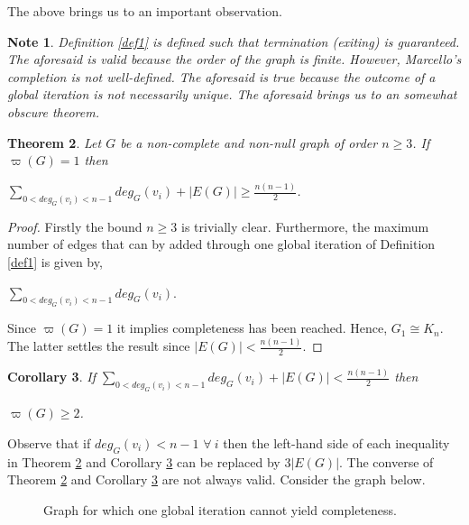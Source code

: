 \documentclass[12pt]{amsart}
\numberwithin{equation}{section}
\newtheorem{theorem}{Theorem}[section]
\newtheorem{corollary}[theorem]{Corollary}
\newtheorem{note}[theorem]{Note}
\numberwithin{equation}{section}
\begin{document}
The above brings us to an important observation.
\begin{note}
Definition \ref{def1} is defined such that termination (exiting) is guaranteed. The aforesaid is valid because the order of the graph is finite. However, Marcello's completion is not well-defined. The aforesaid is true because the outcome of a global iteration is not necessarily unique. The aforesaid brings us to an somewhat obscure theorem.
\end{note}
\begin{theorem}\label{thm1}
Let $G$ be a non-complete and non-null graph of order $n \geq 3$. If $\varpi(G) = 1$ then
\begin{center}
$\sum\limits_{0<deg_G(v_i) < n-1}deg_G(v_i) + |E(G)| \geq \frac{n(n-1)}{2}$.
\end{center}
\end{theorem}
\begin{proof}
Firstly the bound $n \geq 3$ is trivially clear. Furthermore, the maximum number of edges that can by added through one global iteration of Definition \ref{def1} is given by,
\begin{center}
$\sum\limits_{0<deg_G(v_i) < n-1}deg_G(v_i)$.
\end{center}
Since $\varpi(G) = 1$ it implies completeness has been reached. Hence, $G_1 \cong K_n$. The latter settles the result since $|E(G)| < \frac{n(n-1)}{2}$.
\end{proof}
\begin{corollary}\label{cor1}
If $\sum\limits_{0<deg_G(v_i) < n-1}deg_G(v_i) + |E(G)| < \frac{n(n-1)}{2}$ then
\begin{center}
$\varpi(G) \geq 2$.
\end{center}
\end{corollary}
Observe that if $deg_G(v_i) < n-1$ $\forall~i$ then the left-hand side of each inequality in Theorem \ref{thm1} and Corollary \ref{cor1} can be replaced by $3|E(G)|$. The converse of Theorem \ref{thm1} and Corollary \ref{cor1} are not always valid. Consider the graph below.
\begin{figure}[h]
\centering
{}
\caption{Graph for which one global iteration cannot yield completeness.}\label{fig4}
\end{figure}
\end{document}
